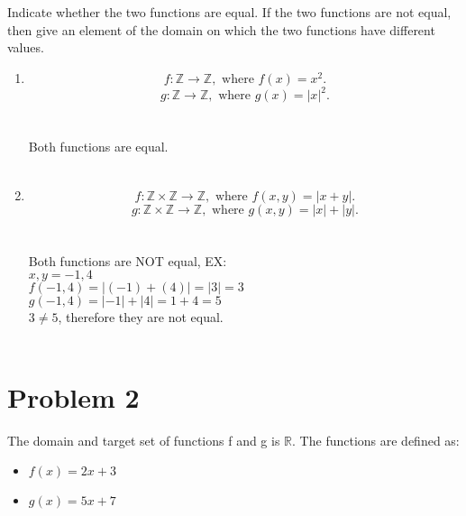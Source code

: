 \documentclass{amsart}
\theoremstyle{definition}
\theoremstyle{Exercise}
\theoremstyle{remark}
\theoremstyle{rule}
\numberwithin{equation}{section}
\newcommand{\Z}{\mathbb Z}
\begin{document}
Indicate whether the two functions are equal. If the two functions are not equal, then give an element of the domain on which the two functions have different values.\\
 \begin{enumerate}[label=(\alph*)]
   \item
\[ f: \Z \to \Z, \text{ where } f(x)= x^2.\]
\[ g: \Z \to \Z, \text{ where } g(x)= |x|^2.\]\\\\
Both functions are equal.
\\\\
\item  \[ f: \Z\times \Z \to \Z, \text{ where } f(x,y)= |x+y|.\]
\[ g: \Z\times \Z \to \Z, \text{ where } g(x,y)= |x|+|y|.\]\\\\
Both functions are NOT equal, EX:\\
$x, y = -1, 4$\\
$f(-1,4) = |(-1) + (4)| = |3| = 3$\\
$g(-1,4) = |-1| + |4| = 1 + 4 = 5$\\
$3 \not= 5$, therefore they are not equal.
\\\\
\end{enumerate}

 \newpage

\section*{Problem 2}

The domain and target set of functions f and g is $\mathbb{R}$. The functions are defined as:
\begin{itemize}
  \item $f(x) = 2x + 3$\\

  \item $g(x) = 5x + 7$\\


\end{itemize}
\end{document}

